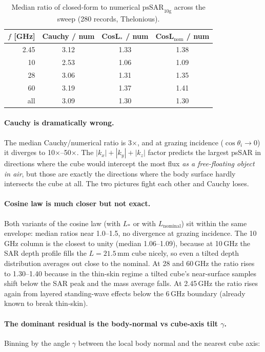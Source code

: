 \documentclass[11pt,a4paper]{article}
\theoremstyle{definition}
\theoremstyle{remark}
\newcommand{\psSAR}{\ensuremath{\mathrm{psSAR}_{10\mathrm{g}}}}
\begin{document}
\begin{table}[ht]
\centering
\caption{Median ratio of closed-form to numerical $\psSAR$ across the
sweep (280 records, Thelonious).}
\label{tab:thelonious-summary}
\begin{tabular}{rccc}
\toprule
$f$ [GHz] & Cauchy / num & CosL$_*$ / num & CosL$_{\mathrm{nom}}$ / num \\
\midrule
2.45  & 3.12 & 1.33 & 1.38 \\
10    & 2.53 & 1.06 & 1.09 \\
28    & 3.06 & 1.31 & 1.35 \\
60    & 3.19 & 1.37 & 1.41 \\
\midrule
all   & 3.09 & 1.30 & 1.30 \\
\bottomrule
\end{tabular}
\end{table}

\paragraph{Cauchy is dramatically wrong.} The median Cauchy/numerical
ratio is 3$\times$, and at grazing incidence ($\cos\theta_i \to 0$) it
diverges to 10$\times$--50$\times$. The $|k_x|+|k_y|+|k_z|$ factor
predicts the largest psSAR in directions where the cube would intercept
the most flux \emph{as a free-floating object in air}, but those are
exactly the directions where the body surface hardly intersects the
cube at all. The two pictures fight each other and Cauchy loses.

\paragraph{Cosine law is much closer but not exact.} Both variants of
the cosine law (with $L_*$ or with $L_{\mathrm{nominal}}$) sit within
the same envelope: median ratios near 1.0--1.5, no divergence at
grazing incidence. The 10\,GHz column is the closest to unity (median
1.06--1.09), because at 10\,GHz the SAR depth profile fills the
$L=21.5$\,mm cube nicely, so even a tilted depth distribution averages
out close to the nominal. At 28 and 60\,GHz the ratio rises to
1.30--1.40 because in the thin-skin regime a tilted cube's
near-surface samples shift below the SAR peak and the mass average
falls. At 2.45\,GHz the ratio rises again from layered standing-wave
effects below the 6\,GHz boundary (already known to break thin-skin).

\paragraph{The dominant residual is the body-normal vs cube-axis tilt
$\gamma$.} Binning by the angle $\gamma$ between the local body normal
and the nearest cube axis:
\end{document}

